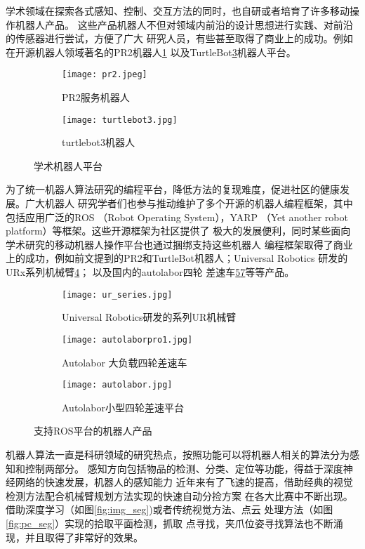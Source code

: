 学术领域在探索各式感知、控制、交互方法的同时，也自研或者培育了许多移动操作机器人产品。
这些产品机器人不但对领域内前沿的设计思想进行实践、对前沿的传感器进行尝试，方便了广大
研究人员，有些甚至取得了商业上的成功。例如在开源机器人领域著名的PR2机器人\ref{fig:pr2}
以及TurtleBot\ref{fig:turtlebot}机器人平台。

\begin{figure}
\centering
\begin{subfigure}{.6\textwidth}
  \centering
  \texttt{[image: pr2.jpeg]}
  \caption{PR2服务机器人}
  \label{fig:pr2}
\end{subfigure}%
\begin{subfigure}{.4\textwidth}
  \centering
  \texttt{[image: turtlebot3.jpg]}
  \caption{turtlebot3机器人}
  \label{fig:turtlebot}
\end{subfigure}
\caption{学术机器人平台}
\end{figure}

为了统一机器人算法研究的编程平台，降低方法的复现难度，促进社区的健康发展。广大机器人
研究学者们也参与推动维护了多个开源的机器人编程框架，其中包括应用广泛的ROS
（Robot Operating System）\cite{quigley2009ros}，YARP
（Yet another robot platform）\cite{metta2006yarp}等框架。这些开源框架为社区提供了
极大的发展便利，同时某些面向学术研究的移动机器人操作平台也通过捆绑支持这些机器人
编程框架取得了商业上的成功，例如前文提到的PR2和TurtleBot机器人；Universal Robotics
研发的URx系列机械臂\ref{fig:urx}； 以及国内的autolabor四轮
差速车\ref{fig:autolaborpro1}\ref{fig:autolabor}等等产品。


\begin{figure}
\centering
\begin{subfigure}{.6\textwidth}
  \centering
  \texttt{[image: ur\_series.jpg]}
  \caption{Universal Robotics研发的系列UR机械臂}
  \label{fig:urx}
\end{subfigure}%
\begin{subfigure}{.4\textwidth}
  \centering
  \texttt{[image: autolaborpro1.jpg]}
  \caption{Autolabor 大负载四轮差速车}
  \label{fig:autolaborpro1}
\end{subfigure}
\begin{subfigure}{.5\textwidth}
  \centering
  \texttt{[image: autolabor.jpg]}
  \caption{Autolabor小型四轮差速平台}
  \label{fig:autolabor}
\end{subfigure}
\caption{支持ROS平台的机器人产品}
\end{figure}


机器人算法一直是科研领域的研究热点，按照功能可以将机器人相关的算法分为感知和控制两部分。
感知方向包括物品的检测、分类、定位等功能，得益于深度神经网络的快速发展，机器人的感知能力
近年来有了飞速的提高，借助经典的视觉检测方法配合机械臂规划方法实现的快速自动分捡方案
在各大比赛中不断出现。借助深度学习（如图\ref{fig:img_seg})或者传统视觉方法、点云
处理方法（如图\ref{fig:pc_seg}）实现的拾取平面检测，抓取
点寻找，夹爪位姿寻找算法也不断涌现，并且取得了非常好的效果。

